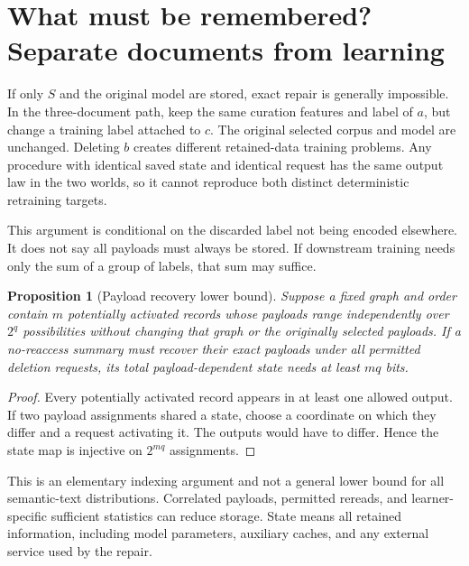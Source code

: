 \documentclass[11pt,a4paper]{article}
\newtheorem{proposition}[theorem]{Proposition}
\theoremstyle{definition}\newtheorem{definition}[theorem]{Definition}
\begin{document}
\section{What must be remembered? Separate documents from learning}
If only $S$ and the original model are stored, exact repair is generally impossible. In the three-document path, keep the same curation features and label of $a$, but change a training label attached to $c$. The original selected corpus and model are unchanged. Deleting $b$ creates different retained-data training problems. Any procedure with identical saved state and identical request has the same output law in the two worlds, so it cannot reproduce both distinct deterministic retraining targets.

This argument is conditional on the discarded label not being encoded elsewhere. It does not say all payloads must always be stored. If downstream training needs only the sum of a group of labels, that sum may suffice.

\begin{proposition}[Payload recovery lower bound]
Suppose a fixed graph and order contain $m$ potentially activated records whose payloads range independently over $2^q$ possibilities without changing that graph or the originally selected payloads. If a no-reaccess summary must recover their exact payloads under all permitted deletion requests, its total payload-dependent state needs at least $mq$ bits.
\end{proposition}
\begin{proof}
Every potentially activated record appears in at least one allowed output. If two payload assignments shared a state, choose a coordinate on which they differ and a request activating it. The outputs would have to differ. Hence the state map is injective on $2^{mq}$ assignments.
\end{proof}
This is an elementary indexing argument and not a general lower bound for all semantic-text distributions. Correlated payloads, permitted rereads, and learner-specific sufficient statistics can reduce storage. State means all retained information, including model parameters, auxiliary caches, and any external service used by the repair.
\end{document}
